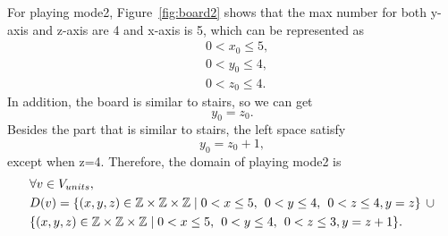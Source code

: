 For playing mode2, Figure~\ref{fig:board2} shows that the max number for both y-axis and z-axis are 4 and x-axis is 5, which can be represented as 
\begin{equation}
\begin{aligned}
&0<x_{0}\leq5,\\
&0<y_{0}\leq4,\\
&0<z_{0}\leq4.
\end{aligned}
\end{equation}
In addition, the board is similar to stairs, so we can get
\begin{equation}
y_{0}=z_{0}.
\end{equation}
Besides the part that is similar to stairs, the left space satisfy 
\begin{equation}
y_{0}=z_{0}+1,
\end{equation}
except when z=4.
Therefore, the domain of playing mode2 is
\begin{equation}
\begin{aligned}
&\forall v \in V_{units},\\
&D(v)=\{(x,y,z) \in \mathbb{Z} \times \mathbb{Z}	\times \mathbb{Z} \mid  0<x \leq 5 , \hspace{1ex} 0<y \leq 4,\hspace{1ex} 0<z \leq 4,y=z\} \hspace{1ex}\cup\\
&\{(x,y,z) \in \mathbb{Z} \times \mathbb{Z}	\times \mathbb{Z} \mid  0<x \leq 5, \hspace{1ex} 0<y \leq 4,\hspace{1ex} 0<z \leq 3,y=z+1\}.
\end{aligned}
\end{equation}
